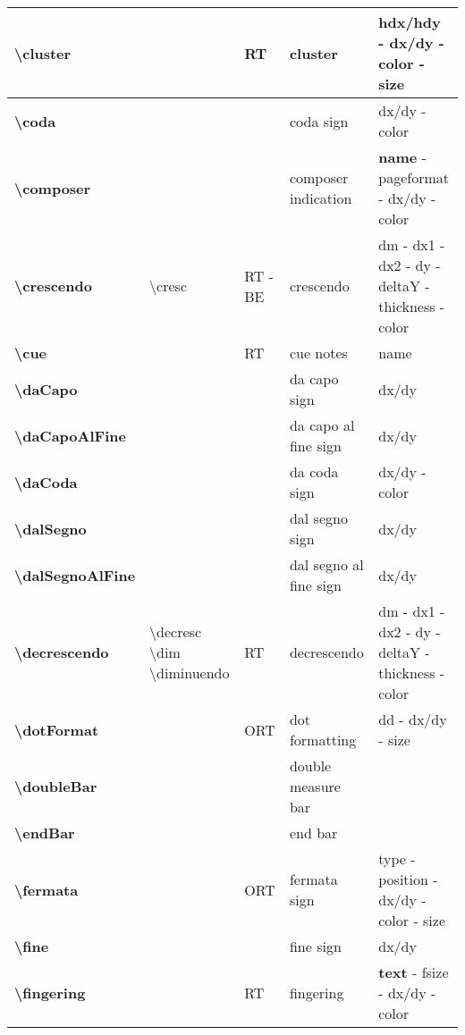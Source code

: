 \documentclass[a4paper, landscape, 10pt]{article}
\begin{document}
\begin{tabularx}{\linewidth}{p{3cm}p{4.5cm}p{3cm}p{5.5cm}l}
    \hline
    \textbf{\textbackslash{}cluster}&&RT&cluster&hdx/hdy - dx/dy - color - size\\
    \hline
    \textbf{\textbackslash{}coda}&&&coda sign&dx/dy - color\\
    \hline
    \textbf{\textbackslash{}composer}&&&composer indication&\textbf{name} - pageformat - dx/dy - color\\
    \hline
    \textbf{\textbackslash{}crescendo}&\textbackslash{}cresc&RT - BE&crescendo&dm - dx1 - dx2 - dy - deltaY - thickness - color\\
    \hline
    \textbf{\textbackslash{}cue}&&RT&cue notes&name\\
    \hline
    \textbf{\textbackslash{}daCapo}&&&da capo sign&dx/dy\\
    \hline
    \textbf{\textbackslash{}daCapoAlFine}&&&da capo al fine sign&dx/dy\\
    \hline
    \textbf{\textbackslash{}daCoda}&&&da coda sign&dx/dy - color\\
    \hline
    \textbf{\textbackslash{}dalSegno}&&&dal segno sign&dx/dy\\
    \hline
    \textbf{\textbackslash{}dalSegnoAlFine}&&&dal segno al fine sign&dx/dy\\
    \hline
    \textbf{\textbackslash{}decrescendo}&\textbackslash{}decresc \textbackslash{}dim \textbackslash{}diminuendo&RT&decrescendo&dm - dx1 - dx2 - dy - deltaY - thickness - color\\
    \hline
    \textbf{\textbackslash{}dotFormat}&&ORT&dot formatting&dd - dx/dy - size\\
    \hline
    \textbf{\textbackslash{}doubleBar}&&&double measure bar&\\
    \hline
    \textbf{\textbackslash{}endBar}&&&end bar&\\
    \hline
    \textbf{\textbackslash{}fermata}&&ORT&fermata sign&type - position - dx/dy - color - size\\
    \hline
    \textbf{\textbackslash{}fine}&&&fine sign&dx/dy\\
    \hline
    \textbf{\textbackslash{}fingering}&&RT&fingering&\textbf{text} - fsize - dx/dy - color\\

\end{tabularx}
\end{document}
